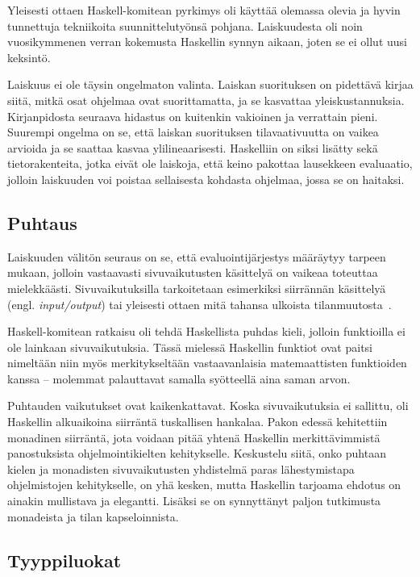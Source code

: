 \documentclass[finnish]{tktltiki2}
\begin{document}
Yleisesti ottaen Haskell-komitean pyrkimys oli käyttää olemassa olevia ja hyvin tunnettuja
tekniikoita suunnittelutyönsä pohjana. Laiskuudesta oli noin vuosikymmenen verran kokemusta
Haskellin synnyn aikaan, joten se ei ollut uusi keksintö.

Laiskuus ei ole täysin ongelmaton valinta. Laiskan suorituksen on pidettävä kirjaa siitä, mitkä osat
ohjelmaa ovat suorittamatta, ja se kasvattaa yleiskustannuksia. Kirjanpidosta seuraava hidastus on
kuitenkin vakioinen ja verrattain pieni. Suurempi ongelma on se, että laiskan suorituksen
tilavaativuutta on vaikea arvioida ja se saattaa kasvaa ylilineaarisesti. Haskelliin on siksi
lisätty sekä tietorakenteita, jotka eivät ole laiskoja, että keino pakottaa lausekkeen evaluaatio,
jolloin laiskuuden voi poistaa sellaisesta kohdasta ohjelmaa, jossa se on haitaksi.

\subsection{Puhtaus}

Laiskuuden välitön seuraus on se, että evaluointijärjestys määräytyy tarpeen mukaan, jolloin
vastaavasti sivuvaikutusten käsittelyä on vaikeaa toteuttaa mielekkäästi. Sivuvaikutuksilla
tarkoitetaan esimerkiksi siirrännän käsittelyä (engl. \emph{input/output}) tai yleisesti ottaen mitä
tahansa ulkoista tilanmuutosta~.

Haskell-komitean ratkaisu oli tehdä Haskellista puhdas kieli, jolloin funktioilla ei ole lainkaan
sivuvaikutuksia. Tässä mielessä Haskellin funktiot ovat paitsi nimeltään niin myös merkitykseltään
vastaavanlaisia matemaattisten funktioiden kanssa -- molemmat palauttavat samalla syötteellä aina
saman arvon.

Puhtauden vaikutukset ovat kaikenkattavat. Koska sivuvaikutuksia ei sallittu, oli Haskellin
alkuaikoina siirräntä tuskallisen hankalaa. Pakon edessä kehitettiin monadinen siirräntä, jota
voidaan pitää yhtenä Haskellin merkittävimmistä panostuksista ohjelmointikielten kehitykselle.
Keskustelu siitä, onko puhtaan kielen ja monadisten sivuvaikutusten yhdistelmä paras lähestymistapa
ohjelmistojen kehitykselle, on yhä kesken, mutta Haskellin tarjoama ehdotus on ainakin mullistava ja
elegantti. Lisäksi se on synnyttänyt paljon tutkimusta monadeista ja tilan kapseloinnista.

\subsection{Tyyppiluokat}
\end{document}
